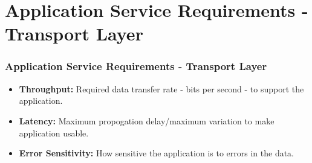 \documentclass{beamer}
\begin{document}
\section{Application Service Requirements - Transport Layer}
\begin{frame}
\frametitle{Application Service Requirements - Transport Layer}
\begin{itemize}
\item \textbf{Throughput:} Required data transfer rate - bits per second - to support the application.
\item \textbf{Latency:} Maximum propogation delay/maximum variation to make application usable. 
\item \textbf{Error Sensitivity:} How sensitive the application is to errors in the data.
\end{itemize}
\end{frame}
\end{document}
